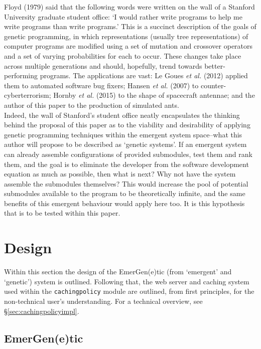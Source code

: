 \documentclass[compsoc,12pt,a4paper]{IEEEtran}
\begin{document}
			Floyd (1979) said that the following words were written on the wall of a Stanford University graduate student office: `I would rather write programs to help me write programs than write programs.'\cite{floyd} This is a succinct description of the goals of genetic programming, in which representations (usually tree representations) of computer programs are modified using a set of mutation and crossover operators and a set of varying probabilities for each to occur. These changes take place across multiple generations and should, hopefully, trend towards better-performing programs. The applications are vast: Le Goues \textit{et al.} (2012) applied them to automated software bug fixers;\cite{genprog} Hansen \textit{et al.} (2007) to counter-cyberterrorism;\cite{security} Hornby \textit{et al.} (2015) to the shape of spacecraft antennae;\cite{antenna} and the author of this paper to the production of simulated ants.\cite{ants}\\
			Indeed, the wall of Stanford's student office neatly encapsulates the thinking behind the proposal of this paper as to the viability and desirability of applying genetic programming techniques within the emergent system space--what this author will propose to be described as `genetic systems'. If an emergent system can already assemble configurations of provided submodules, test them and rank them, and the goal is to eliminate the developer from the software development equation as much as possible, then what is next? Why not have the system assemble the submodules themselves? This would increase the pool of potential submodules available to the program to be theoretically infinite, and the same benefits of this emergent behaviour would apply here too. It is this hypothesis that is to be tested within this paper.
	
	\newpage
	
	\section{Design}
	\label{sec:design}
	
		Within this section the design of the EmerGen(e)tic (from `emergent' and `genetic') system is outlined. Following that, the web server and caching system used within the \lstinline|cachingpolicy| module are outlined, from first principles, for the non-technical user's understanding. For a technical overview, see \S \ref{sec:cachingpolicyimpl}.
			
		\subsection{EmerGen(e)tic}
		
\end{document}

